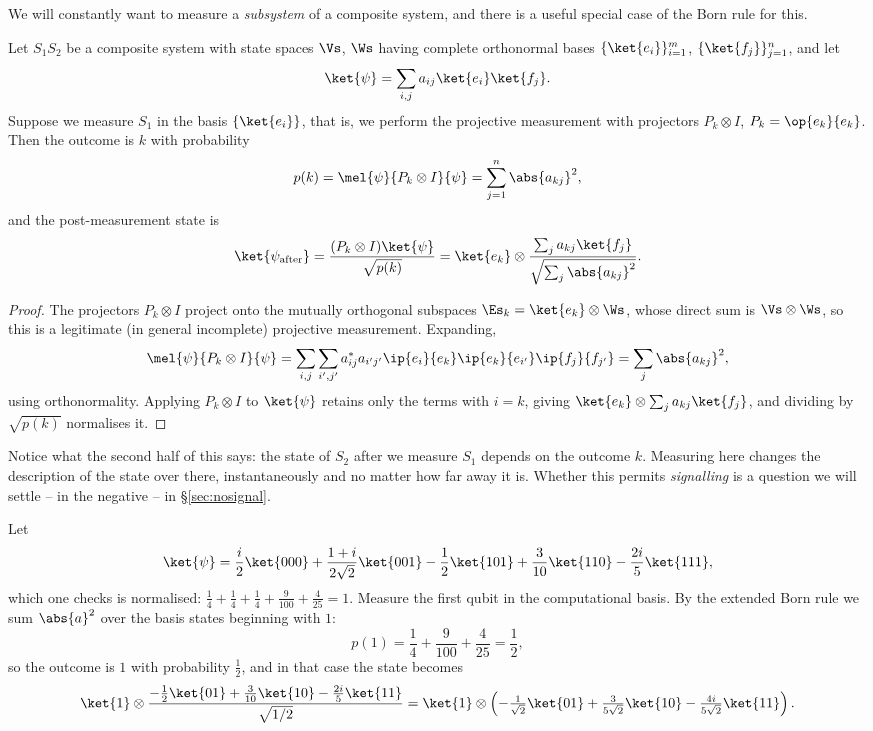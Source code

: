 We will constantly want to measure a \emph{subsystem} of a composite system, and there is a useful special case of the Born rule for this.

\begin{proposition}
	Let $S_1S_2$ be a composite system with state spaces $\Vs$, $\Ws$ having complete orthonormal bases $\{\ket{e_i}\}_{i=1}^m$, $\{\ket{f_j}\}_{j=1}^n$, and let
	$$\ket{\psi} = \sum_{i,j} a_{ij}\ket{e_i}\ket{f_j}.$$
	Suppose we measure $S_1$ in the basis $\{\ket{e_i}\}$, that is, we perform the projective measurement with projectors $P_k \otimes I$, $P_k = \op{e_k}{e_k}$. Then the outcome is $k$ with probability
	$$p(k) = \mel{\psi}{P_k\otimes I}{\psi} = \sum_{j=1}^n \abs{a_{kj}}^2,$$
	and the post-measurement state is
	$$\ket{\psi_{\text{after}}} = \frac{(P_k\otimes I)\ket{\psi}}{\sqrt{p(k)}} = \ket{e_k}\otimes\frac{\sum_j a_{kj}\ket{f_j}}{\sqrt{\sum_j \abs{a_{kj}}^2}}.$$
\end{proposition}

\begin{proof}
	The projectors $P_k \otimes I$ project onto the mutually orthogonal subspaces $\Es_k = \ket{e_k}\otimes\Ws$, whose direct sum is $\Vs\otimes\Ws$, so this is a legitimate (in general incomplete) projective measurement. Expanding,
	$$\mel{\psi}{P_k \otimes I}{\psi} = \sum_{i,j}\sum_{i',j'}a_{ij}^*a_{i'j'}\ip{e_i}{e_k}\ip{e_k}{e_{i'}}\ip{f_j}{f_{j'}} = \sum_j \abs{a_{kj}}^2,$$
	using orthonormality. Applying $P_k\otimes I$ to $\ket{\psi}$ retains only the terms with $i = k$, giving $\ket{e_k}\otimes\sum_j a_{kj}\ket{f_j}$, and dividing by $\sqrt{p(k)}$ normalises it.
\end{proof}

Notice what the second half of this says: the state of $S_2$ after we measure $S_1$ depends on the outcome $k$. Measuring here changes the description of the state over there, instantaneously and no matter how far away it is. Whether this permits \emph{signalling} is a question we will settle -- in the negative -- in \S\ref{sec:nosignal}.

\begin{example}
	Let
	$$\ket{\psi} = \frac{i}{2}\ket{000} + \frac{1+i}{2\sqrt2}\ket{001} - \frac{1}{2}\ket{101} + \frac{3}{10}\ket{110} - \frac{2i}{5}\ket{111},$$
	which one checks is normalised: $\tfrac14 + \tfrac14 + \tfrac14 + \tfrac9{100} + \tfrac4{25} = 1$. Measure the first qubit in the computational basis. By the extended Born rule we sum $\abs{a}^2$ over the basis states beginning with $1$:
	$$p(1) = \frac14 + \frac{9}{100} + \frac{4}{25} = \frac{1}{2},$$
	so the outcome is $1$ with probability $\tfrac12$, and in that case the state becomes
	$$\ket{1}\otimes\frac{-\tfrac12\ket{01} + \tfrac3{10}\ket{10} - \tfrac{2i}5\ket{11}}{\sqrt{1/2}} = \ket{1}\otimes\left(-\tfrac{1}{\sqrt2}\ket{01} + \tfrac{3}{5\sqrt2}\ket{10} - \tfrac{4i}{5\sqrt2}\ket{11}\right).$$
\end{example}

